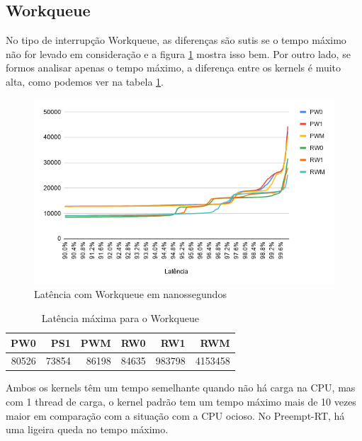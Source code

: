 \subsection{Workqueue}

No tipo de interrupção Workqueue, as diferenças são sutis se o tempo máximo não for levado em consideração e a figura \ref{grafico:workqueue} mostra isso bem. Por outro lado, se formos analisar apenas o tempo máximo, a diferença entre os kernels é muito alta, como podemos ver na tabela \ref{table:max-workqueue}.

\begin{figure}[!p]
    \centering
    \includegraphics[width=\textwidth]{graficos/workqueue.png}
    \caption{Latência com Workqueue em nanossegundos}
    \label{grafico:workqueue}
\end{figure}

\begin{table}[!p]
    \centering
    \begin{center}
        \begin{tabular}{|r|r|r|r|r|r|}
            \toprule
                PW0 &    PS1 &    PWM &    RW0 &     RW1 &    RWM \\
            \midrule
                80526 &  73854 &  86198 & 84635 &  983798 &  4153458 \\
            \bottomrule
        \end{tabular}
    \end{center}
    \caption{Latência máxima para o Workqueue}
    \label{table:max-workqueue}
\end{table}

Ambos os kernels têm um tempo semelhante quando não há carga na CPU, mas com 1 thread de carga, o kernel padrão tem um tempo máximo mais de 10 vezes maior em comparação com a situação com a CPU ocioso. No Preempt-RT, há uma ligeira queda no tempo máximo.

